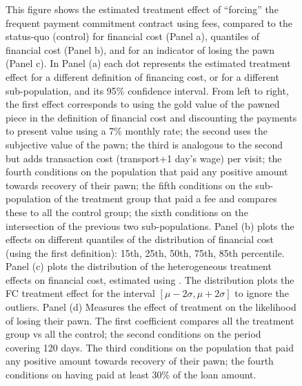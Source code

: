 \documentclass[11pt]{article}
\begin{document}
\begin{figure}[H]
\begin{center}
    \end{center}
        \scriptsize 
        This figure shows the estimated treatment effect of ``forcing'' the frequent payment commitment contract using fees, compared to the status-quo (control) for  financial cost (Panel a), quantiles of financial cost (Panel b), and for an indicator of losing the pawn (Panel c). In Panel (a) each dot represents the estimated treatment effect for a different definition of financing cost, or for a different sub-population, and its 95\% confidence interval. From left to right, the first effect corresponds to using the gold value of the pawned piece in the definition of financial cost and discounting the payments to present value using a 7\% monthly rate; the second uses the subjective value of the pawn; the third is analogous to the second but adds transaction cost (transport+1 day's wage) per visit; the fourth conditions on the population that paid any positive amount towards recovery of their pawn; the fifth conditions on the sub-population of the treatment group that paid a fee and compares these to all the control group; the sixth conditions on the intersection of the previous two sub-populations. Panel (b) plots the effects on different quantiles of the distribution of financial cost (using the first definition): 15th, 25th, 50th, 75th, 85th percentile.
        Panel (c) plots the distribution of the heterogeneous treatment effects on financial cost, estimated using \cite{atheygrf}. The distribution plots the FC treatment effect for the interval $[\mu-2\sigma,\mu+2\sigma]$ to ignore the outliers. Panel (d) Measures the effect of treatment on the likelihood of losing their pawn. The first coefficient compares all the treatment group vs all the control; the second conditions on the period covering 120 days. The third conditions on the population that paid any positive amount towards recovery of their pawn; the fourth conditions on having paid at least 30\% of the loan amount.   %
\end{figure}
\end{document}
